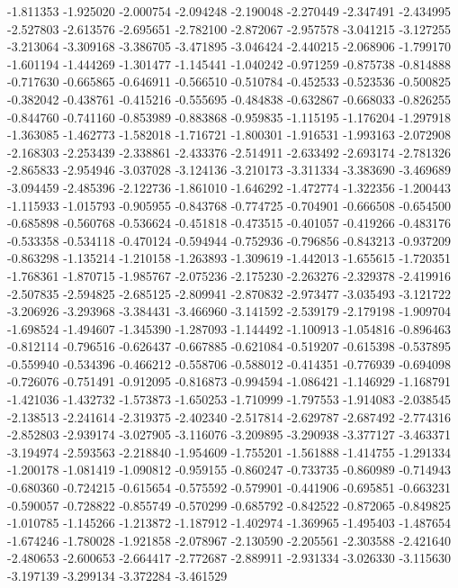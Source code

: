 -1.811353
-1.925020
-2.000754
-2.094248
-2.190048
-2.270449
-2.347491
-2.434995
-2.527803
-2.613576
-2.695651
-2.782100
-2.872067
-2.957578
-3.041215
-3.127255
-3.213064
-3.309168
-3.386705
-3.471895
-3.046424
-2.440215
-2.068906
-1.799170
-1.601194
-1.444269
-1.301477
-1.145441
-1.040242
-0.971259
-0.875738
-0.814888
-0.717630
-0.665865
-0.646911
-0.566510
-0.510784
-0.452533
-0.523536
-0.500825
-0.382042
-0.438761
-0.415216
-0.555695
-0.484838
-0.632867
-0.668033
-0.826255
-0.844760
-0.741160
-0.853989
-0.883868
-0.959835
-1.115195
-1.176204
-1.297918
-1.363085
-1.462773
-1.582018
-1.716721
-1.800301
-1.916531
-1.993163
-2.072908
-2.168303
-2.253439
-2.338861
-2.433376
-2.514911
-2.633492
-2.693174
-2.781326
-2.865833
-2.954946
-3.037028
-3.124136
-3.210173
-3.311334
-3.383690
-3.469689
-3.094459
-2.485396
-2.122736
-1.861010
-1.646292
-1.472774
-1.322356
-1.200443
-1.115933
-1.015793
-0.905955
-0.843768
-0.774725
-0.704901
-0.666508
-0.654500
-0.685898
-0.560768
-0.536624
-0.451818
-0.473515
-0.401057
-0.419266
-0.483176
-0.533358
-0.534118
-0.470124
-0.594944
-0.752936
-0.796856
-0.843213
-0.937209
-0.863298
-1.135214
-1.210158
-1.263893
-1.309619
-1.442013
-1.655615
-1.720351
-1.768361
-1.870715
-1.985767
-2.075236
-2.175230
-2.263276
-2.329378
-2.419916
-2.507835
-2.594825
-2.685125
-2.809941
-2.870832
-2.973477
-3.035493
-3.121722
-3.206926
-3.293968
-3.384431
-3.466960
-3.141592
-2.539179
-2.179198
-1.909704
-1.698524
-1.494607
-1.345390
-1.287093
-1.144492
-1.100913
-1.054816
-0.896463
-0.812114
-0.796516
-0.626437
-0.667885
-0.621084
-0.519207
-0.615398
-0.537895
-0.559940
-0.534396
-0.466212
-0.558706
-0.588012
-0.414351
-0.776939
-0.694098
-0.726076
-0.751491
-0.912095
-0.816873
-0.994594
-1.086421
-1.146929
-1.168791
-1.421036
-1.432732
-1.573873
-1.650253
-1.710999
-1.797553
-1.914083
-2.038545
-2.138513
-2.241614
-2.319375
-2.402340
-2.517814
-2.629787
-2.687492
-2.774316
-2.852803
-2.939174
-3.027905
-3.116076
-3.209895
-3.290938
-3.377127
-3.463371
-3.194974
-2.593563
-2.218840
-1.954609
-1.755201
-1.561888
-1.414755
-1.291334
-1.200178
-1.081419
-1.090812
-0.959155
-0.860247
-0.733735
-0.860989
-0.714943
-0.680360
-0.724215
-0.615654
-0.575592
-0.579901
-0.441906
-0.695851
-0.663231
-0.590057
-0.728822
-0.855749
-0.570299
-0.685792
-0.842522
-0.872065
-0.849825
-1.010785
-1.145266
-1.213872
-1.187912
-1.402974
-1.369965
-1.495403
-1.487654
-1.674246
-1.780028
-1.921858
-2.078967
-2.130590
-2.205561
-2.303588
-2.421640
-2.480653
-2.600653
-2.664417
-2.772687
-2.889911
-2.931334
-3.026330
-3.115630
-3.197139
-3.299134
-3.372284
-3.461529
